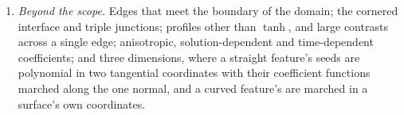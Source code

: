 \documentclass[11pt]{amsart}
\theoremstyle{definition}
\theoremstyle{remark}
\begin{document}
\begin{enumerate}
  boundary-value problem per stencil in place of the march along its
  lines, for the curves the guard of Section~\ref{sec:curved} refuses and
  for two close interfaces neither parallel nor concentric; and on the
  ring, the question Section~\ref{sec:ring} leaves open, why fifteen
  jump-aware functions fit its mode at $O(h^5)$, and a criterion other than
  the diagonal share for the Gaussians of the rows anchored in a layer.
\item \emph{Beyond the scope.} Edges that meet the boundary of the domain;
  the cornered interface and triple junctions; profiles other than
  $\tanh$, and large contrasts across a single edge; anisotropic,
  solution-dependent and time-dependent coefficients; and three
  dimensions, where a straight feature's seeds are polynomial in two
  tangential coordinates with their coefficient functions marched along the
  one normal, and a curved feature's are marched in a surface's own
  coordinates.
\end{enumerate}
\end{document}
